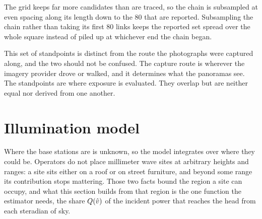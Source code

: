 The grid keeps far more candidates than are traced, so the chain is subsampled
at even spacing along its length down to the 80 that are reported. Subsampling
the chain rather than taking its first 80 links keeps the reported set spread
over the whole square instead of piled up at whichever end the chain began.

This set of standpoints is distinct from the route the photographs were captured
along, and the two should not be confused. The capture route is wherever the
imagery provider drove or walked, and it determines what the panoramas see. The
standpoints are where exposure is evaluated. They overlap but are neither equal
nor derived from one another.

\section{Illumination model}
\label{sec:illum}

%
%
%
%
%

Where the base stations are is unknown, so the model integrates over where they
could be. Operators do not place millimeter wave sites at arbitrary heights and
ranges: a site sits either on a roof or on street furniture, and beyond some
range its contribution stops mattering. Those two facts bound the region a site
can occupy, and what this section builds from that region is the one function the
estimator needs, the share $Q(\hat{v})$ of the incident power that reaches the head
from each steradian of sky.

